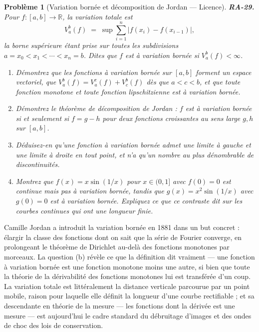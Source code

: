 \documentclass[11pt]{article}
\newtheorem{problem}{Problème}
\begin{document}
\bigskip

\begin{problem}[{Variation bornée et décomposition de Jordan --- Licence}]
\textbf{RA-29.} Pour $ f : [a,b] \to \mathbb{R} $, la \textit{variation totale} est
\[ V_a^b(f) \;=\; \sup \sum_{i=1}^{n} \left| f(x_i) - f(x_{i-1}) \right|, \]
la borne supérieure étant prise sur toutes les subdivisions $ a = x_0 < x_1 < \cdots < x_n = b $.
Dites que $ f $ est \textit{à variation bornée} si $ V_a^b(f) < \infty $.
\begin{enumerate}
\item[(a)] Démontrez que les fonctions à variation bornée sur $ [a,b] $ forment un espace vectoriel, que
$ V_a^b(f) = V_a^c(f) + V_c^b(f) $ dès que $ a < c < b $, et que toute fonction monotone
et toute fonction lipschitzienne est à variation bornée.
\item[(b)] Démontrez le théorème de décomposition de Jordan : $ f $ est à variation bornée si et
seulement si $ f = g - h $ pour deux fonctions croissantes au sens large $ g, h $ sur
$ [a,b] $.
\item[(c)] Déduisez-en qu'une fonction à variation bornée admet une limite à gauche et une limite à droite
en tout point, et n'a qu'un nombre au plus dénombrable de discontinuités.
\item[(d)] Montrez que $ f(x) = x \sin(1/x) $ pour $ x \in (0,1] $ avec $ f(0) = 0 $ est continue
mais pas à variation bornée, tandis que $ g(x) = x^2 \sin(1/x) $ avec $ g(0) = 0 $ est à
variation bornée. Expliquez ce que ce contraste dit sur les courbes continues qui ont une longueur
finie.
\end{enumerate}

\end{problem}

\noindent Camille Jordan a introduit la variation bornée en 1881 dans un but concret :
élargir la classe des fonctions dont on sait que la série de Fourier converge, en prolongeant le
théorème de Dirichlet au-delà des fonctions monotones par morceaux. La question (b) révèle ce que la
définition dit vraiment --- une fonction à variation bornée est une fonction monotone moins une autre,
si bien que toute la théorie de la dérivabilité des fonctions monotones lui est transférée d'un
coup. La variation totale est littéralement la distance verticale parcourue par un point mobile,
raison pour laquelle elle définit la longueur d'une courbe rectifiable ; et sa descendante en
théorie de la mesure --- les fonctions dont la dérivée est une mesure --- est aujourd'hui le cadre
standard du débruitage d'images et des ondes de choc des lois de conservation.
\end{document}
